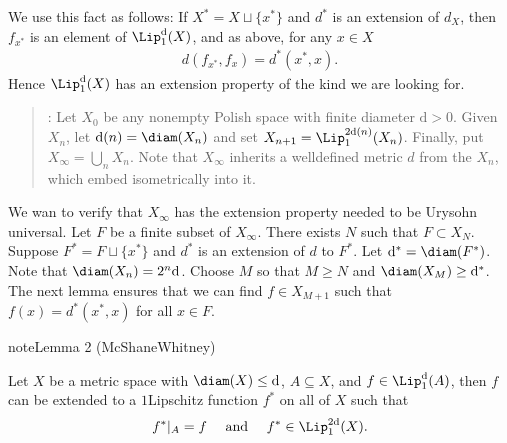 \documentclass[letterpaper,10pt,english]{jupyterBook}
\begin{document}
\sphinxAtStartPar
We use this fact as follows: If \(X^* = X \sqcup \{x^*\}\) and \(d^*\) is an extension of \(d_X\), then \(f_{x^*}\) is an element of \(\Lip^{\mathrm{d}}_1(X)\), and as above, for any \(x \in X\)
\begin{equation*}
\begin{split}
	d(f_{x^*}, f_x) = d^*(x^*,x).
\end{split}
\end{equation*}
\sphinxAtStartPar
Hence \(\Lip^{\mathrm{d}}_1(X)\) has an extension property of the kind we are looking for.
\begin{quote}

\sphinxAtStartPar
{}: Let \(X_0\) be any non\sphinxhyphen{}empty Polish space with finite diameter \(\mathrm{d} > 0\). Given \(X_n\), let \(\mathrm{d}(n) = \diam(X_n)\) and set \(X_{n+1} = \Lip^{2\mathrm{d}(n)}_1(X_n)\). Finally, put \(X_\infty = \bigcup_n X_n\). Note that \(X_\infty\) inherits a well\sphinxhyphen{}defined metric \(d\) from the \(X_n\), which embed isometrically into it.
\end{quote}

\sphinxAtStartPar
We wan to verify that \(X_\infty\) has the extension property needed to be Urysohn universal. Let \(F\) be a finite subset of \(X_\infty\). There exists \(N\) such that \(F \subset X_N\). Suppose \(F^* = F \sqcup \{x^*\}\) and \(d^*\) is an extension of \(d\) to \(F^*\). Let \(\mathrm{d}^* = \diam(F^*)\). Note that \(\diam(X_n) = 2^n \mathrm{d}\). Choose \(M\) so that \(M \geq N\) and \(\diam(X_M) \geq \mathrm{d}^*\). The next lemma ensures that we can find \(f \in X_{M+1}\) such that \(f(x) = d^*(x^*,x)\) for all \(x \in F\).
\label{Urysohn:lemma-5}
\begin{sphinxadmonition}{note}{Lemma 2 (McShane\sphinxhyphen{}Whitney)}



\sphinxAtStartPar
Let \(X\) be a metric space with \(\diam(X) \leq \mathrm d\), \(A \subseteq X\), and \(f \in \Lip^{\mathrm{d}}_1(A)\), then \(f\) can be extended to a \(1\)\sphinxhyphen{}Lipschitz function \(f^*\) on all of \(X\) such that
\begin{equation*}
\begin{split}
	f^*|_A = f \quad \text{ and } \quad f^* \in \Lip^{2\mathrm{d}}_1(X).
\end{split}
\end{equation*}\end{sphinxadmonition}
\end{document}
